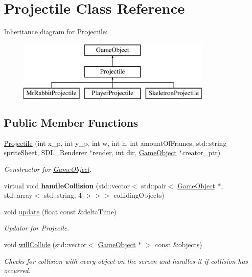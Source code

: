 \hypertarget{class_projectile}{}\section{Projectile Class Reference}
\label{class_projectile}
Inheritance diagram for Projectile\+:\begin{figure}[H]
\begin{center}
\leavevmode
\includegraphics[height=3.000000cm]{class_projectile}
\end{center}
\end{figure}
\subsection*{Public Member Functions}
\begin{DoxyCompactItemize}
\item 
\hyperlink{class_projectile_afadf6ea4be9118e7af9dbe3f9d64e3ca}{Projectile} (int x\+\_\+p, int y\+\_\+p, int w, int h, int amount\+Of\+Frames, std\+::string sprite\+Sheet, S\+D\+L\+\_\+\+Renderer $\ast$render, int dir, \hyperlink{class_game_object}{Game\+Object} $\ast$creator\+\_\+ptr)
\begin{DoxyCompactList}\small\item\em Constructor for \hyperlink{class_game_object}{Game\+Object}. \end{DoxyCompactList}\item 
\hypertarget{class_projectile_a2bcd6e71abdfb70d278e90bff9be5f76}{}virtual void {\bfseries handle\+Collision} (std\+::vector$<$ std\+::pair$<$ \hyperlink{class_game_object}{Game\+Object} $\ast$, std\+::array$<$ std\+::string, 4 $>$$>$$>$ colliding\+Objects)\label{class_projectile_a2bcd6e71abdfb70d278e90bff9be5f76}

\item 
void \hyperlink{class_projectile_adf4854afefc6fdc8efbeb0f8e50b589c}{update} (float const \&delta\+Time)
\begin{DoxyCompactList}\small\item\em Updator for Projecile. \end{DoxyCompactList}\item 
void \hyperlink{class_projectile_aa6148f7507c5971232c1030db87c6aa7}{will\+Collide} (std\+::vector$<$ \hyperlink{class_game_object}{Game\+Object} $\ast$ $>$ const \&objects)
\begin{DoxyCompactList}\small\item\em Checks for collision with every object on the screen and handles it if collision has occurred. \end{DoxyCompactList}\end{DoxyCompactItemize}
